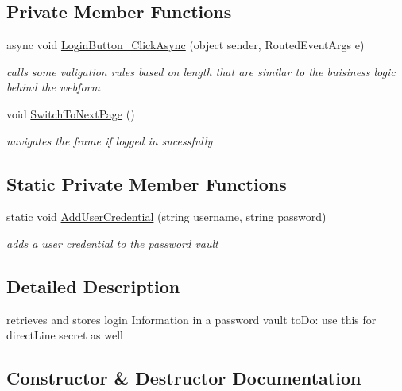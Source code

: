 \subsection*{Private Member Functions}
\begin{DoxyCompactItemize}
\item 
async void \mbox{\hyperlink{class_listen_to_me_1_1_login_page_ace57aa2c75a95bab9c32ea95bc9adb31}{Login\+Button\+\_\+\+Click\+Async}} (object sender, Routed\+Event\+Args e)
\begin{DoxyCompactList}\small\item\em calls some valigation rules based on length that are similar to the buisiness logic behind the webform \end{DoxyCompactList}\item 
void \mbox{\hyperlink{class_listen_to_me_1_1_login_page_a3f7972af36ca0c72f1bd37c4a3f84c14}{Switch\+To\+Next\+Page}} ()
\begin{DoxyCompactList}\small\item\em navigates the frame if logged in sucessfully \end{DoxyCompactList}\end{DoxyCompactItemize}
\subsection*{Static Private Member Functions}
\begin{DoxyCompactItemize}
\item 
static void \mbox{\hyperlink{class_listen_to_me_1_1_login_page_af6692799b00ea2ad405a7af8dff73ad3}{Add\+User\+Credential}} (string username, string password)
\begin{DoxyCompactList}\small\item\em adds a user credential to the password vault \end{DoxyCompactList}\end{DoxyCompactItemize}


\subsection{Detailed Description}
retrieves and stores login Information in a password vault to\+Do\+: use this for direct\+Line secret as well 



\subsection{Constructor \& Destructor Documentation}
\mbox{\label{class_listen_to_me_1_1_login_page_afcefc5f9f4f5cee5d9f5e15493e4058b}} 
